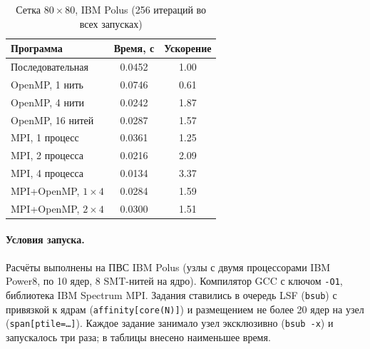 \documentclass[12pt,a4paper]{article}
\begin{document}
\begin{table}[H]\centering
\caption{Сетка $80\times80$, IBM Polus (256 итераций во всех запусках)}
\begin{tabular}{lcc}\toprule
Программа & Время, с & Ускорение \\\midrule
Последовательная & 0.0452 & 1.00 \\
OpenMP, 1 нить & 0.0746 & 0.61 \\
OpenMP, 4 нити & 0.0242 & 1.87 \\
OpenMP, 16 нитей & 0.0287 & 1.57 \\
MPI, 1 процесс & 0.0361 & 1.25 \\
MPI, 2 процесса & 0.0216 & 2.09 \\
MPI, 4 процесса & 0.0134 & 3.37 \\
MPI+OpenMP, $1\times4$ & 0.0284 & 1.59 \\
MPI+OpenMP, $2\times4$ & 0.0300 & 1.51 \\
\bottomrule
\end{tabular}
\end{table}

\paragraph{Условия запуска.} Расчёты выполнены на ПВС IBM Polus (узлы с двумя процессорами
IBM Power8, по 10 ядер, 8 SMT-нитей на ядро). Компилятор GCC с ключом \texttt{-O1}, библиотека
IBM Spectrum MPI. Задания ставились в очередь LSF (\texttt{bsub}) с привязкой к ядрам
(\texttt{affinity[core(N)]}) и размещением не более 20 ядер на узел
(\texttt{span[ptile=\dots]}). Каждое задание занимало узел эксклюзивно (\texttt{bsub -x}) и запускалось три раза; в таблицы
внесено наименьшее время.
\end{document}
